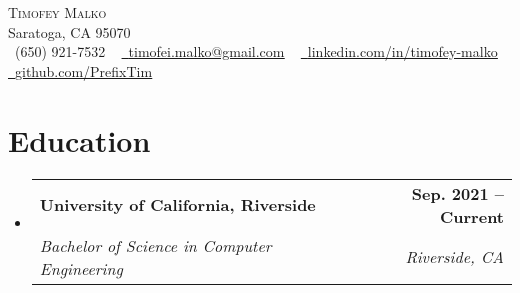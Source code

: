\documentclass[letterpaper,11pt]{article}
\makeatletter
\newcommand{\resumeSubheading}[4]{
  \vspace{-2pt}\item
    \begin{tabular*}{1.0\textwidth}[t]{l@{\extracolsep{\fill}}r}
      \textbf{#1} & \textbf{\small #2} \\
      \textit{\small#3} & \textit{\small #4} \\
    \end{tabular*}\vspace{-7pt}
}
\newcommand{\resumeSubHeadingListStart}{\begin{itemize}[leftmargin=0.0in, label={}]}
\newcommand{\resumeSubHeadingListEnd}{\end{itemize}}
\makeatother
\begin{document}

\begin{center}
    {\Huge \scshape Timofey Malko} \\ \vspace{1pt}
    Saratoga, CA 95070 \\ \vspace{1pt}
    \small \raisebox{-0.1\height}\faPhone\ (650) 921-7532 ~ \href{mailto:timofei.malko@gmail.com}{\raisebox{-0.2\height}\faEnvelope\  \underline{timofei.malko@gmail.com}} ~ 
    \href{https://www.linkedin.com/in/timofey-malko/}{\raisebox{-0.2\height}\faLinkedin\ \underline{linkedin.com/in/timofey-malko}}  ~
    \href{https://github.com/PrefixTim}{\raisebox{-0.2\height}\faGithub\ \underline{github.com/PrefixTim}}
    \vspace{-8pt}
\end{center}


\section{Education}
  \resumeSubHeadingListStart
    \resumeSubheading
      {University of California, Riverside}{Sep. 2021 -- Current}
      {Bachelor of Science in Computer Engineering}{Riverside, CA}
  \resumeSubHeadingListEnd

\end{document}
